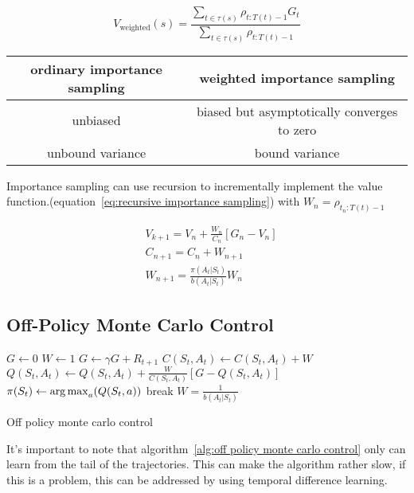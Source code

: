 \begin{equation}
V_{\text{weighted}}(s) = \frac{\sum_{t\in \tau(s)} \rho_{t:T(t)-1}G_t}{\sum_{t\in \tau(s)} \rho_{t:T(t)-1}}
\label{eq:weighted importance sampling}
\end{equation}


\begin{center}
\begin{tabular}{ c | c}
ordinary importance sampling & weighted importance sampling \\
\hline
unbiased & biased but asymptotically converges to zero \\
unbound variance & bound variance
\end{tabular}	
\end{center}

Importance sampling can use recursion to incrementally implement the value function.(equation~\ref{eq:recursive importance sampling}) with $W_n = \rho_{t_n:T(t)-1}$ 

\begin{equation}
\begin{split}
&V_{k+1} = V_n + \frac{W_n}{C_n}[G_n - V_n] \\
&C_{n+1} = C_n + W_{n+1} \\
&W_{n+1} = \frac{\pi(A_t | S_t)}{b(A_t | S_t)}W_n
\end{split}
\label{eq:recursive importance sampling}
\end{equation}

\subsection{Off-Policy Monte Carlo Control}

\begin{algorithm}
\begin{algorithmic}
	\State $G \gets 0$
	\State $W \gets 1$
		\State $G \gets \gamma G + R_{t+1}$
		\State $C(S_t, A_t) \gets C(S_t, A_t) + W$
		\State $Q(S_t, A_t) \gets Q(S_t, A_t) + \frac{W}{C(S_t, A_t)}[G-Q(S_t, A_t)]$
		\State $\pi(S_t) \gets \operatorname*{arg\,max}_a(Q(S_t,a))$
			\State break
		\EndIf
		\State $W=\frac{1}{b(A_t|S_t)}$
	\EndFor
\end{algorithmic}
\caption{Off policy monte carlo control}
\label{alg:off policy monte carlo control}
\end{algorithm}

It's important to note that algorithm~\ref{alg:off policy monte carlo control} only can learn from the tail of the trajectories. This can make the algorithm rather slow, if this is a problem, this can be addressed by using temporal difference learning.

